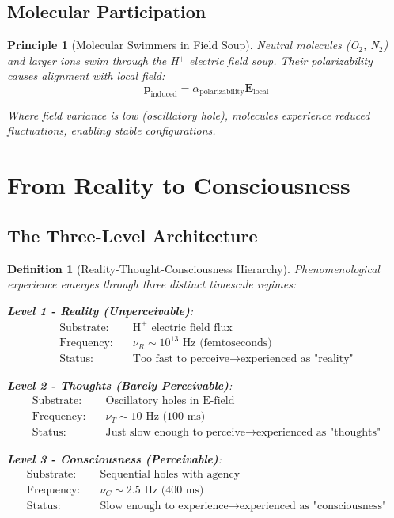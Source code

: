 \documentclass[12pt,a4paper]{article}
\newtheorem{definition}[theorem]{Definition}
\newtheorem{principle}[theorem]{Principle}
\begin{document}
\subsection{Molecular Participation}

\begin{principle}[Molecular Swimmers in Field Soup]
Neutral molecules (O$_2$, N$_2$) and larger ions swim through the H$^+$ electric field soup. Their polarizability causes alignment with local field:
\begin{equation}
\mathbf{p}_{\text{induced}} = \alpha_{\text{polarizability}} \mathbf{E}_{\text{local}}
\end{equation}

Where field variance is low (oscillatory hole), molecules experience reduced fluctuations, enabling stable configurations.
\end{principle}

\section{From Reality to Consciousness}

\subsection{The Three-Level Architecture}

\begin{definition}[Reality-Thought-Consciousness Hierarchy]
Phenomenological experience emerges through three distinct timescale regimes:

\textbf{Level 1 - Reality (Unperceivable)}:
\begin{align}
\text{Substrate:} \quad & \text{H}^+ \text{ electric field flux} \\
\text{Frequency:} \quad & \nu_R \sim 10^{13} \text{ Hz (femtoseconds)} \\
\text{Status:} \quad & \text{Too fast to perceive} \rightarrow \text{experienced as "reality"}
\end{align}

\textbf{Level 2 - Thoughts (Barely Perceivable)}:
\begin{align}
\text{Substrate:} \quad & \text{Oscillatory holes in E-field} \\
\text{Frequency:} \quad & \nu_T \sim 10 \text{ Hz (100 ms)} \\
\text{Status:} \quad & \text{Just slow enough to perceive} \rightarrow \text{experienced as "thoughts"}
\end{align}

\textbf{Level 3 - Consciousness (Perceivable)}:
\begin{align}
\text{Substrate:} \quad & \text{Sequential holes with agency} \\
\text{Frequency:} \quad & \nu_C \sim 2.5 \text{ Hz (400 ms)} \\
\text{Status:} \quad & \text{Slow enough to experience} \rightarrow \text{experienced as "consciousness"}
\end{align}
\end{definition}
\end{document}
